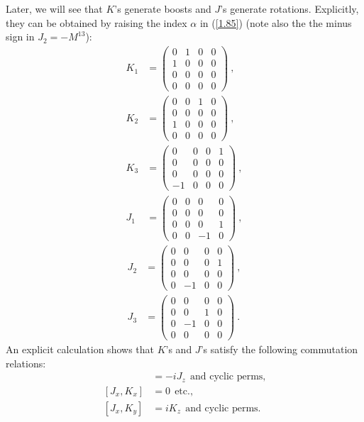 \documentclass[12pt,a4paper]{report}
\begin{document}
Later, we will see that $K$’s generate boosts and $J$’s generate rotations. Explicitly, they can be obtained by raising the index $\alpha$ in (\eqref{1.85}) (note also the the minus sign in $J_2 = −M^{13}$):
\begin{align*}
   K_1&=\begin{pmatrix}
    0&1&0&0\\
    1&0&0&0\\
    0&0&0&0\\
    0&0&0&0
\end{pmatrix}~,\\
K_2&=\begin{pmatrix}
    0&0&1&0\\
    0&0&0&0\\
    1&0&0&0\\
    0&0&0&0
\end{pmatrix}~,\\
K_3&=\begin{pmatrix}
    0&0&0&1\\
    0&0&0&0\\
    0&0&0&0\\
    -1&0&0&0
\end{pmatrix}~,\\
J_1&=\begin{pmatrix}
    0&0&0&0\\
    0&0&0&0\\
    0&0&0&1\\
    0&0&-1&0
\end{pmatrix}~,
\end{align*}
\begin{align}
J_2&=\begin{pmatrix}
    0&0&0&0\\
    0&0&0&1\\
    0&0&0&0\\
    0&-1&0&0
\end{pmatrix}~,\nonumber\\
J_3&=\begin{pmatrix}
    0&0&0&0\\
    0&0&1&0\\
    0&-1&0&0\\
    0&0&0&0
\end{pmatrix}~.
\end{align}
An explicit calculation shows that $K$’s and $J$’s satisfy the following commutation
relations: \cite{Hitoshi, Ryder}
\begin{align}
    [K_x,K_y]&=-iJ_z~~\text{and cyclic perms,}\\
    [J_x,K_x]&=0~~\text{etc.,}\\
    [J_x,K_y]&=iK_z~~\text{and cyclic perms}.
\end{align}
\end{document}
